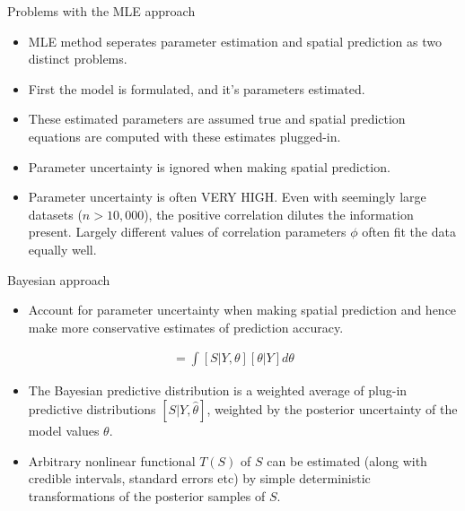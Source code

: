 \documentclass{beamer}
\begin{document}
\begin{frame}{Problems with the MLE approach}

\begin{itemize}
\item MLE method seperates parameter estimation and spatial prediction as two distinct problems.
\item First the model is formulated, and it's parameters estimated.
\item These estimated parameters are assumed true and spatial prediction equations are computed with these estimates plugged-in.
\item Parameter uncertainty is ignored when making spatial prediction.
\item Parameter uncertainty is often VERY HIGH. Even with seemingly large datasets ($n > 10,000$), the positive correlation dilutes the information present. Largely different values of correlation parameters $\phi$ often fit the data equally well.
\end{itemize}

\end{frame}

\begin{frame}{Bayesian approach}

\begin{itemize}
\item Account for parameter uncertainty when making spatial prediction and hence make more conservative estimates of prediction accuracy.
\end{itemize}

\begin{align*}
[S | Y ] = \int [S | Y, \theta ] [ \theta | Y ] d \theta
\end{align*}

\begin{itemize}
\item The Bayesian predictive distribution is a weighted average of plug-in predictive distributions $[S | Y, \hat{\theta} ]$, weighted by the posterior uncertainty of the model values $\theta$.
\item Arbitrary nonlinear functional $T(S)$ of $S$ can be estimated (along with credible intervals, standard errors etc) by simple deterministic transformations of the posterior samples of $S$.
\end{itemize}

\end{frame}
\end{document}
